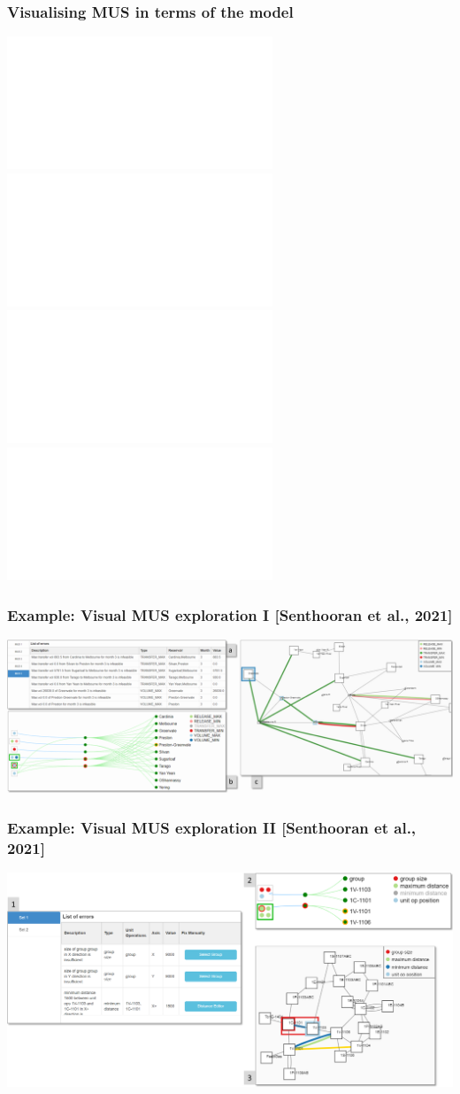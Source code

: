 \begin{frame}
\frametitle{Visualising MUS in terms of the model}

\includegraphics<1>[width=\textwidth]{images/latinD1.pdf}
\includegraphics<2>[width=\textwidth]{images/latinD2.pdf}
\includegraphics<3>[width=\textwidth]{images/latinD5.pdf}
\includegraphics<4>[width=\textwidth]{images/latinD6.pdf}

\end{frame}

\begin{frame}
  \frametitle{Example: Visual MUS exploration I [Senthooran et al., 2021]}
  
  \includegraphics[width=\textwidth]{images/conflict-visualisations-mw.png}
  
\end{frame}

\begin{frame}
  \frametitle{Example: Visual MUS exploration II [Senthooran et al., 2021]}
  
  \includegraphics[width=\textwidth]{images/conflict-visualisations.png}

\end{frame}


